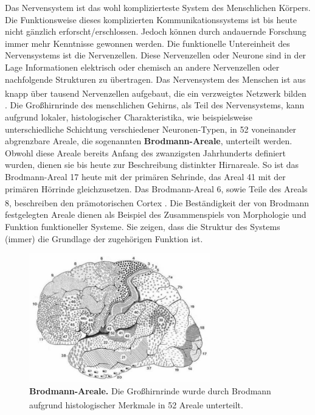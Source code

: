 \documentclass[12pt,a4paper,pdftex]{article}
\begin{document}
 Das Nervensystem ist das wohl komplizierteste System des Menschlichen Körpers. Die Funktionsweise dieses komplizierten Kommunikationssystems ist bis heute nicht gänzlich erforscht/erschlossen. Jedoch können durch andauernde Forschung immer mehr Kenntnisse gewonnen werden. Die funktionelle Untereinheit des Nervensystems ist die Nervenzellen. Diese Nervenzellen oder Neurone sind in der Lage Informationen elektrisch oder chemisch an andere Nervenzellen oder nachfolgende Strukturen zu übertragen. Das Nervensystem des Menschen ist aus knapp über tausend Nervenzellen aufgebaut, die ein verzweigtes Netzwerk bilden \textsuperscript{\cite[1]{trepel2011neuroanatomie}}. Die Großhirnrinde des menschlichen Gehirns, als Teil des Nervensystems, kann aufgrund lokaler, histologischer Charakteristika, wie beispielsweise unterschiedliche Schichtung verschiedener Neuronen-Typen, in 52 voneinander abgrenzbare Areale, die sogenannten \textbf{Brodmann-Areale}, unterteilt werden. Obwohl diese Areale bereits Anfang des zwanzigsten Jahrhunderts definiert wurden, dienen sie bis heute zur Beschreibung distinkter Hirnareale. So ist das Brodmann-Areal 17 heute mit der primären Sehrinde, das Areal 41 mit der primären Hörrinde gleichzusetzen. Das Brodmann-Areal 6, sowie Teile des Areals 8, beschreiben den prämotorischen Cortex \textsuperscript{\cite[9]{trepel2011neuroanatomie}}. Die Beständigkeit der von Brodmann festgelegten Areale dienen als Beispiel des Zusammenspiels von Morphologie und Funktion funktioneller Systeme. Sie zeigen, dass die Struktur des Systems (immer) die Grundlage der zugehörigen Funktion ist.

\begin{figure}[H]
    \centering
    \includegraphics[width=0.7\textwidth]{pictures/Bilder_Jule/Andere/brodmann.PNG}
    \caption[Brodmann-Areale]{\textbf{Brodmann-Areale.} Die Großhirnrinde wurde durch Brodmann aufgrund histologischer Merkmale in 52 Areale unterteilt. \textsuperscript{\cite[9]{trepel2011neuroanatomie}}}
    \label{fig:brodmann_areale}
\end{figure}{}
\end{document}
